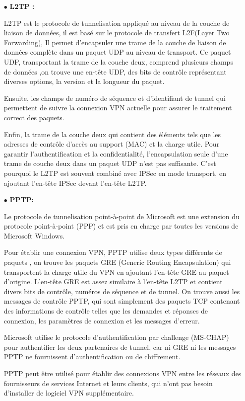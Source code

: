     \begin{itemize}
  	\item[$\bullet$]\textbf{L2TP :} 
  	
  	L2TP est le protocole de tunnelisation appliqué au niveau de la couche de liaison de données, il est basé sur le protocole de transfert L2F(Layer Two Forwarding), Il permet d'encapsuler une trame de la couche de liaison de données complète dans un paquet UDP au niveau de transport. Ce paquet UDP, transportant la trame de la couche deux, comprend plusieurs champs de données ,on trouve une en-tête UDP, des bits de contrôle représentant diverses options, la version et la longueur du paquet.
  	
  	 Ensuite, les champs de numéro de séquence et d'identifiant de tunnel qui permettent de suivre la connexion VPN actuelle pour assurer le traitement correct des paquets.
  	 
  	  Enfin, la trame de la couche deux qui contient des éléments tels que les adresses de contrôle d'accès au support (MAC) et la charge utile.
  	Pour garantir l'authentification et la confidentialité, l'encapsulation seule d'une trame de couche deux dans un paquet UDP n'est pas suffisante. C'est pourquoi le L2TP est souvent combiné avec IPSec en mode transport, en ajoutant l'en-tête IPSec devant l'en-tête L2TP. 
  \end{itemize}
     \begin{itemize}
  	\item[$\bullet$]\textbf{PPTP:} 
  	
  Le protocole de tunnelisation point-à-point de Microsoft est une extension du protocole point-à-point (PPP) et est pris en charge par toutes les versions de Microsoft Windows. 
  
  Pour établir une connexion VPN, PPTP utilise deux types différents de paquets , on trouve les paquets GRE (Generic Routing Encapsulation) qui transportent la charge utile du VPN en ajoutant l’en-tête GRE au paquet d’origine. L’en-tête GRE est assez similaire à l’en-tête L2TP et contient divers bits de contrôle, numéros de séquence et de tunnel. On trouve aussi les messages de contrôle PPTP, qui sont simplement des paquets TCP contenant des informations de contrôle telles que les demandes et réponses de connexion, les paramètres de connexion et les messages d'erreur.
  
  Microsoft utilise le protocole d'authentification par challenge (MS-CHAP) pour authentifier les deux partenaires de tunnel, car ni GRE ni les messages PPTP ne fournissent d'authentification ou de chiffrement.
 
  PPTP peut être utilisé pour établir des connexions VPN entre les réseaux des fournisseurs de services Internet et leurs clients, qui n'ont pas besoin d'installer de logiciel VPN supplémentaire. 
  \end{itemize}
